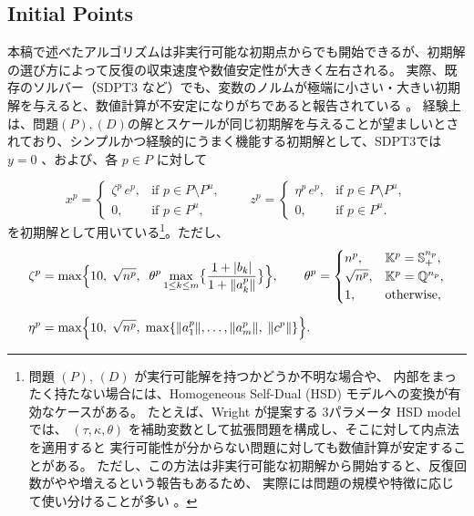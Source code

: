\documentclass{jsarticle}
\begin{document}
\medskip


\subsection{Initial Points}
\label{sec:initial_points}

本稿で述べたアルゴリズムは非実行可能な初期点からでも開始できるが、初期解の選び方によって反復の収束速度や数値安定性が大きく左右される。
実際、既存のソルバー（SDPT3 など）でも、変数のノルムが極端に小さい・大きい初期解を与えると、数値計算が不安定になりがちであると報告されている \cite{toh1999}。
経験上は、問題$(P),(D)$の解とスケールが同じ初期解を与えることが望ましいとされており、シンプルかつ経験的にうまく機能する初期解として、SDPT3では $y = 0$ 、および、各 $p\in P$ に対して

\[
    x^p = \begin{cases}
        \zeta^p\, e^p, & \text{if } p \in P \setminus P^u,\\
        0, & \text{if } p\in P^u,
    \end{cases}
    \quad
    \quad 
    z^p = \begin{cases}
        \eta^p\, e^p, & \text{if } p \in P \setminus P^u,\\
        0, & \text{if } p\in P^u.
    \end{cases}
\]
を初期解として用いている\footnote{問題 $(P)$, $(D)$ が実行可能解を持つかどうか不明な場合や、
内部をまったく持たない場合には、Homogeneous Self-Dual (HSD) モデルへの変換が有効なケースがある。
たとえば、Wright \cite{Wright1997} が提案する 3パラメータ HSD model では、
$(\tau, \kappa, \theta)$ を補助変数として拡張問題を構成し、そこに対して内点法を適用すると
実行可能性が分からない問題に対しても数値計算が安定することがある。
ただし、この方法は非実行可能な初期解から開始すると、反復回数がやや増えるという報告もあるため、
実際には問題の規模や特徴に応じて使い分けることが多い \cite{toh1999}。}。ただし、
\begin{align*}
    \zeta^p 
    &= \max\Bigl\{
       10,\;\sqrt{n^p},\;\;\theta^p \max_{1 \le k \le m}\bigl\{\frac{1 + |b_k|}{1 + \|a^p_k\|}\bigr\}
      \Bigr\},
    \quad
    \quad
    \theta^p = \begin{cases}
        n^p, & \mathbb{K}^p=\mathbb{S}^{n_p}_+,\\
        \sqrt{n^p}, & \mathbb{K}^p=\mathbb{Q}^{n_p},\\
        1, & \text{otherwise},
    \end{cases}
    \\[6pt]
    \eta^p 
    &= \max\Bigl\{
       10,\;\sqrt{n^p},\;\max\{\|a^p_1\|,\ldots,\|a^p_m\|,\;\|c^p\|\}
      \Bigr\}.
\end{align*}
\end{document}
